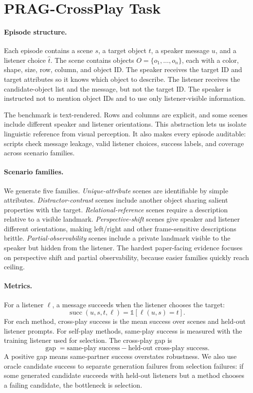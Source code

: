 \documentclass{article}
\begin{document}
\section{PRAG-CrossPlay Task}

\paragraph{Episode structure.}
Each episode contains a scene $s$, a target object $t$, a speaker message $u$, and a listener choice $\hat{t}$. The scene contains objects $O=\{o_1,\ldots,o_n\}$, each with a color, shape, size, row, column, and object ID. The speaker receives the target ID and target attributes so it knows which object to describe. The listener receives the candidate-object list and the message, but not the target ID. The speaker is instructed not to mention object IDs and to use only listener-visible information.

The benchmark is text-rendered. Rows and columns are explicit, and some scenes include different speaker and listener orientations. This abstraction lets us isolate linguistic reference from visual perception. It also makes every episode auditable: scripts check message leakage, valid listener choices, success labels, and coverage across scenario families.

\paragraph{Scenario families.}
We generate five families. \emph{Unique-attribute} scenes are identifiable by simple attributes. \emph{Distractor-contrast} scenes include another object sharing salient properties with the target. \emph{Relational-reference} scenes require a description relative to a visible landmark. \emph{Perspective-shift} scenes give speaker and listener different orientations, making left/right and other frame-sensitive descriptions brittle. \emph{Partial-observability} scenes include a private landmark visible to the speaker but hidden from the listener. The hardest paper-facing evidence focuses on perspective shift and partial observability, because easier families quickly reach ceiling.

\paragraph{Metrics.}
For a listener $\ell$, a message succeeds when the listener chooses the target:
\[
  \operatorname{succ}(u,s,t,\ell)=\mathbb{1}[\ell(u,s)=t].
\]
For each method, cross-play success is the mean success over scenes and held-out listener prompts. For self-play methods, same-play success is measured with the training listener used for selection. The cross-play gap is
\[
  \operatorname{gap}=\text{same-play success}-\text{held-out cross-play success}.
\]
A positive gap means same-partner success overstates robustness. We also use oracle candidate success to separate generation failures from selection failures: if some generated candidate succeeds with held-out listeners but a method chooses a failing candidate, the bottleneck is selection.
\end{document}
